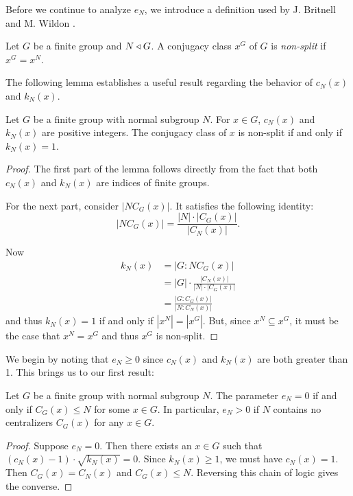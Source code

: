 \documentclass[main.tex]{subfiles}
\begin{document}
 Before we continue to analyze $e_N$, we introduce a definition used by J. Britnell and M. Wildon \cite{britnellwildonarticle}.

\hss

\begin{definition}
Let $G$ be a finite group and $N \triangleleft G$. A conjugacy class $x^G$ of $G$ is \emph{non-split} if $x^G = x^N$.
\end{definition}

\hss

The following lemma establishes a useful result regarding the behavior of $c_N(x)$ and $k_N(x)$.

\begin{lemma}\label{kn1}
Let $G$ be a finite group with normal subgroup $N$. For $x \in G$, $c_N(x)$ and $k_N(x)$ are positive integers. The conjugacy class of $x$ is non-split if and only if $k_N(x) = 1$.
\end{lemma}

\begin{proof}
The first part of the lemma follows directly from the fact that both $c_N(x)$ and $k_N(x)$ are indices of finite groups.

For the next part, consider $|NC_G(x)|$. It satisfies the following identity:
$$|NC_G(x)| = \frac{|N| \cdot |C_G(x)|}{|C_N(x)|}\text{.}$$

Now
\begin{align*}
k_N(x) &= |G : NC_G(x)| \\
&= |G| \cdot \frac{|C_N(x)|}{|N| \cdot |C_G(x)|} \\
&= \frac{|G : C_G(x)|}{|N : C_N(x)|}
\end{align*}
and thus $k_N(x) = 1$ if and only if $|x^N| = |x^G|$. But, since $x^N \subseteq x^G$, it must be the case that $x^N = x^G$ and thus $x^G$ is non-split.
\end{proof}

We begin by noting that $e_N \ge 0$ since $c_N(x)$ and $k_N(x)$ are both greater than 1. This brings us to our first result:

\begin{theorem}\label{en0}
Let $G$ be a finite group with normal subgroup $N$. The parameter $e_N = 0$ if and only if $C_G(x) \le N$ for some $x \in G$. In particular, $e_N > 0$ if $N$ contains no centralizers $C_G(x)$ for any $x \in G$.
\end{theorem}

\begin{proof}
Suppose $e_N = 0$. Then there exists an $x \in G$ such that $(c_N(x) - 1) \cdot \sqrt{k_N(x)} = 0$. Since $k_N(x) \ge 1$, we must have $c_N(x) = 1$. Then $C_G(x) = C_N(x)$ and $C_G(x) \le N$. Reversing this chain of logic gives the converse.
\end{proof}
\end{document}

